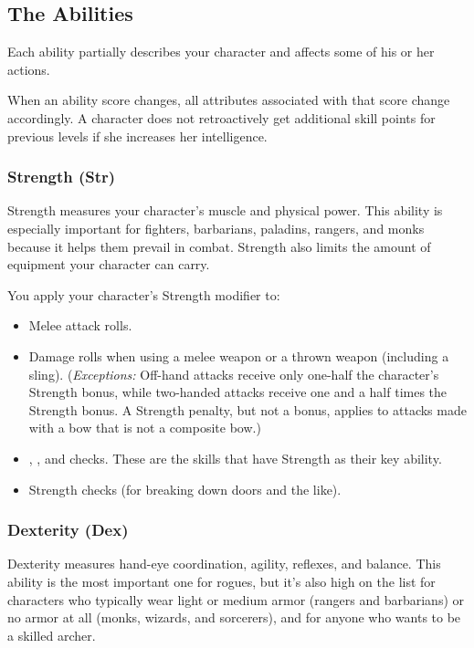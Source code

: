 \subsection{The Abilities}

Each ability partially describes your character and affects some of his or her 
actions.

When an ability score changes, all attributes associated with that score change 
accordingly. A character does not retroactively get additional skill points for 
previous levels if she increases her intelligence.

\subsubsection{Strength (Str)}

Strength measures your character's muscle and physical power. This ability is especially 
important for fighters, barbarians, paladins, rangers, and monks because it helps 
them prevail in combat. Strength also limits the amount of equipment your character 
can carry.

You apply your character's Strength modifier to:
\begin{itemize}
\item Melee attack rolls.
\item Damage rolls when using a melee weapon or a thrown weapon (including a sling). 
(\textit{Exceptions:} Off-hand attacks receive only one-half the character's Strength 
bonus, while two-handed attacks receive one and a half times the Strength bonus. 
A Strength penalty, but not a bonus, applies to attacks made with a bow that is 
not a composite bow.)
\item {}, , and  checks. These are the skills that have Strength as their 
key ability.
\item Strength checks (for breaking down doors and the like).
\end{itemize}

\subsubsection{Dexterity (Dex)}

Dexterity measures hand-eye coordination, agility, reflexes, and balance. This 
ability is the most important one for rogues, but it's also high on the list for 
characters who typically wear light or medium armor (rangers and barbarians) or 
no armor at all (monks, wizards, and sorcerers), and for anyone who wants to be 
a skilled archer.

